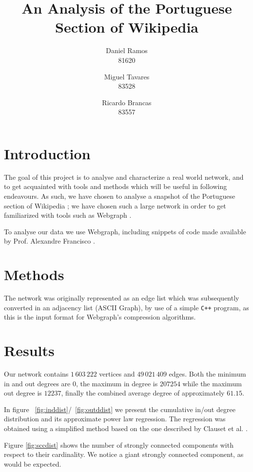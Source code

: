 \documentclass[9pt,a4paper,twocolumn]{article}
\title{An Analysis of the Portuguese Section of Wikipedia}
\author{Daniel Ramos \\ 81620 \and Miguel Tavares \\ 83528 \and Ricardo Brancas  \\ 83557}
\begin{document}
\maketitle

\section{Introduction}
The goal of this project is to analyse and characterize a real world network, and to  get 
acquainted with tools and methods which will be useful in following endeavours.
As such, we have chosen to analyse a snapshot of the Portuguese section of Wikipedia \cite{dataset};
we have chosen such a large network in order to get familiarized with tools such as Webgraph \cite{webgraph}.

To analyse our data we use Webgraph, including snippets of code made available
by Prof. Alexandre Francisco \cite{aplf}.


\section{Methods}
The network was originally represented as an edge list which was subsequently converted in an adjacency list (ASCII Graph), by use of a simple \texttt{C++} program, as this is the input
format for Webgraph's compression algorithms. 





\section{Results}

Our network contains $1\,603\,222$ vertices and $49\,021\,409$ edges. Both the minimum in and out degrees are $0$, the maximum in degree is $207254$ while the maximum out degree is $12237$, finally the combined average degree of approximately $61.15$.
\vspace{1\baselineskip}

In figure ~\ref{fig:inddist}/~\ref{fig:outddist} we present the cumulative in/out degree distribution and its approximate power law regression. The regression was obtained using a simplified method based on the one described by Clauset et al. \cite{Clauset2009}.

Figure \ref{fig:sccdist} shows the number of strongly connected components with respect to their cardinality. We notice a giant strongly connected component, as would be expected.
\end{document}
